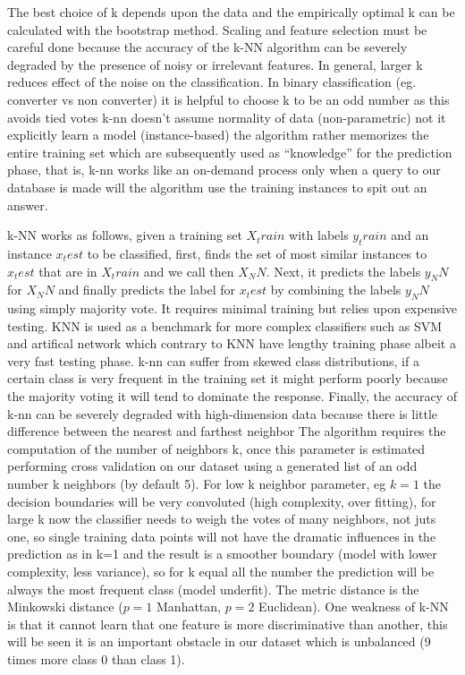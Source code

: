 \documentclass[11pt]{article}
\begin{document}
The best choice of k depends upon the data and the empirically optimal k can be calculated with the bootstrap method. Scaling and feature selection must be careful done because the accuracy of the k-NN algorithm can be severely degraded by the presence of noisy or irrelevant features. In general, larger k reduces effect of the noise on the classification. In binary classification (eg. converter vs non converter) it is helpful to choose k to be an odd number as this avoids tied votes
k-nn doesn't assume normality of data (non-parametric) not it explicitly learn a model (instance-based) the algorithm rather memorizes the entire training set which are subsequently used as “knowledge” for the prediction phase, that is, k-nn works like an on-demand process only when a query to our database is made will the algorithm use the training instances to spit out an answer. 

k-NN works as follows, given a training set $X_train$ with labels $y_train$ and an instance $x_test$ to be classified, first, finds the set of most similar instances to $x_test$ that are in $X_train$ and we call then $X_NN$. Next, it predicts the labels $y_NN$ for $X_NN$ and finally predicts the label for $x_test$ by combining the labels $y_NN$ using simply majority vote. 
It requires minimal training but relies upon expensive testing. KNN is used as a benchmark for more complex classifiers such as SVM and artifical network which contrary to KNN have lengthy training phase albeit a very fast testing phase. k-nn can suffer from skewed class distributions, if a certain class is very frequent in the training set it might perform poorly because the majority voting it will tend to dominate the response. Finally, the accuracy of k-nn can be severely degraded with high-dimension data because there is little difference between the nearest and farthest neighbor
The algorithm requires the computation of the number of neighbors k, once this parameter is estimated performing cross validation on our dataset using a generated list of an odd number k neighbors (by default 5). For low k neighbor parameter, eg $k=1$ the decision boundaries will be very convoluted (high complexity, over fitting), for large k now the classifier needs to weigh the votes of many neighbors, not juts one, so single training data points will not have the dramatic influences in the prediction as in k=1 and the result is a smoother boundary (model with lower complexity, less variance), so for k equal all the number the prediction will be always the most frequent class (model underfit). The metric distance is the Minkowski distance ($p=1$ Manhattan, $p=2$ Euclidean). 
One weakness of k-NN  is that it cannot learn that one feature is more discriminative than another, this will be seen it is an important obstacle in our dataset which is unbalanced (9 times more class 0 than class 1).
\end{document}
